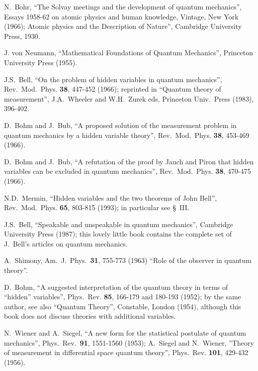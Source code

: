 \documentclass[12pt,onecolumn]{article}%
\begin{document}
\begin{thebibliography}{999}                                                                                              %


N.\ Bohr, ``The Solvay meetings and the development of quantum
mechanics'', Essays 1958-62 on atomic physics and human knowledge, Vintage,
New York (1966); Atomic physics and the Description of Nature'', Cambridge
University Press, 1930.

J. von Neumann, ``Mathematical Foundations of Quantum
Mechanics'', Princeton University Press (1955).

J.S.\ Bell, ``On the problem of hidden variables in quantum
mechanics'', Rev.\ Mod.\ Phys. \textbf{38}, 447-452 (1966); reprinted in
``Quantum theory of measurement'', J.A.\ Wheeler and W.H.\ Zurek eds,
Princeton Univ.\ Press (1983), 396-402.

D.\ Bohm and J.\ Bub, ``A proposed solution of the
measurement problem in quantum mechanics by a hidden variable theory'',
Rev.\ Mod.\ Phys. \textbf{38}, 453-469 (1966).

D.\ Bohm and J.\ Bub, ``A refutation of the proof by
Jauch and Piron that hidden variables can be excluded in quantum mechanics'',
Rev.\ Mod.\ Phys. \textbf{38}, 470-475 (1966).

N.D.\ Mermin, ``Hidden variables and the two theorems of John
Bell'', Rev.\ Mod.\ Phys. \textbf{65}, 803-815 (1993); in particular see \S \ III.

J.S.\ Bell, ``Speakable and unspeakable in quantum
mechanics'', Cambridge University Press (1987); this lovely little book
contains the complete set of J.\ Bell's articles on quantum mechanics.

A.\ Shimony, Am.\ J.\ Phys.\ \textbf{31}, 755-773 (1963)
``Role of the observer in quantum theory''.

D.\ Bohm, ``A suggested interpretation of the quantum theory in
terms of ``hidden'' variables'', Phys.\ Rev. \textbf{85}, 166-179 and 180-193
(1952); by the same author, see also ``Quantum Theory'', Constable, London
(1954), although this book does not discuss theories with additional variables.

N.\ Wiener and A.\ Siegel, ``A new form for the
statistical postulate of quantum mechanics'', Phys.\ Rev.\ \textbf{91},
1551-1560 (1953); A.\ Siegel and N.\ Wiener, ''Theory of measurement in
differential space quantum theory'', Phys.\ Rev. \textbf{101}, 429-432 (1956).


\end{thebibliography}
\end{document}
